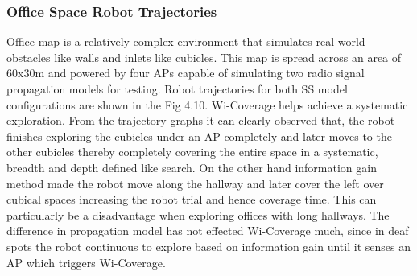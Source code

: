 \subsubsection{Office Space Robot Trajectories}
Office map is a relatively complex environment that simulates real world obstacles like walls and inlets like cubicles. This map is spread across an area of 60x30m and powered by four APs capable of simulating two radio signal propagation models for testing. Robot trajectories for both SS model configurations are shown in the Fig 4.10. Wi-Coverage helps achieve a systematic exploration. From the trajectory graphs it can clearly observed that, the robot finishes exploring the cubicles under an AP completely and later moves to the other cubicles thereby completely covering the entire space in a systematic, breadth and depth defined like search. On the other hand information gain method made the robot move along the hallway and later cover the left over cubical spaces increasing the robot trial and hence coverage time. This can particularly be a disadvantage when exploring offices with long hallways. The difference in propagation model has not effected Wi-Coverage much, since in deaf spots the robot continuous to explore based on information gain until it senses an AP which triggers Wi-Coverage.    

